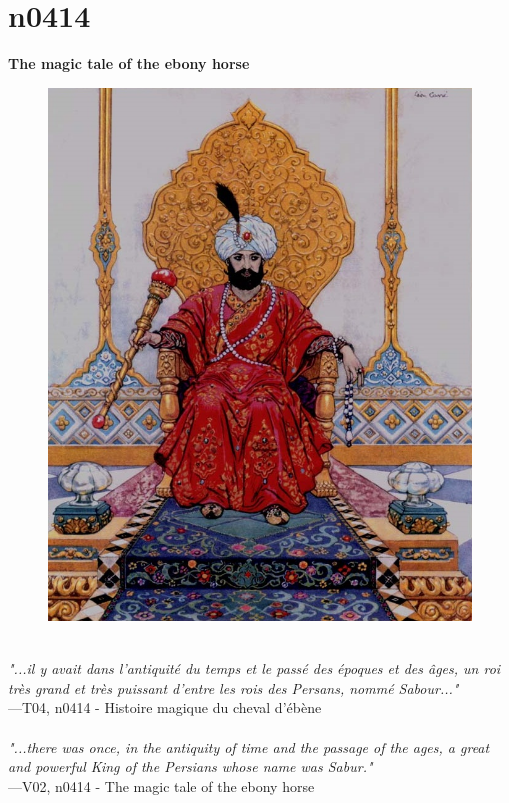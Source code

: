 \documentclass[../Carre_nights.tex]{subfiles}
\begin{document}
\newpage

\section{n0414}
\textbf{\Large{The magic tale of the ebony horse}} \\

\begin{figure}[ht]
\centering
\includegraphics[height=\figsize]{illustrations/volume_4/T04, n0414 - Histoire magique du cheval d'ébène.jpg}
\end{figure}

\textit{\\
"...il y avait dans l’antiquité du temps et le passé des époques et des âges, un roi très grand et très puissant d’entre les rois des Persans, nommé Sabour..."} \\
—T04, n0414 - Histoire magique du cheval d'ébène \\~\\
\textit{"...there was once, in the antiquity of time and the passage of the ages, a great and powerful King of the Persians whose name was Sabur."} \\
—V02, n0414 - The magic tale of the ebony horse
\end{document}
